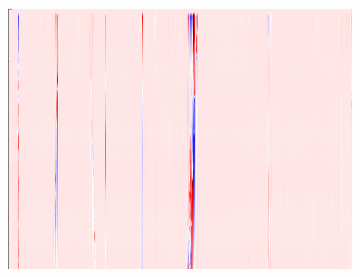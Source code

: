 \begin{figure}[!h]
\begin{subfigure}{0.33\textwidth}
        \includegraphics[width=\textwidth]{figures/test.png}
    \end{subfigure}


    \vspace{1em}
    

\end{figure}
